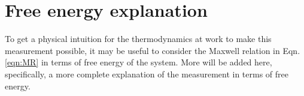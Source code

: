 \section{Free energy explanation}
\label{sec:fenergy}

To get a physical intuition for the thermodynamics at work to make this measurement possible, it may be useful to consider the Maxwell relation in Eqn.\ref{eqn:MR} in terms of free energy of the system. More will be added here, specifically, a more complete explanation of the measurement in terms of free energy.

\endinput

Any text after an \endinput is ignored.
You could put scraps here or things in progress.
